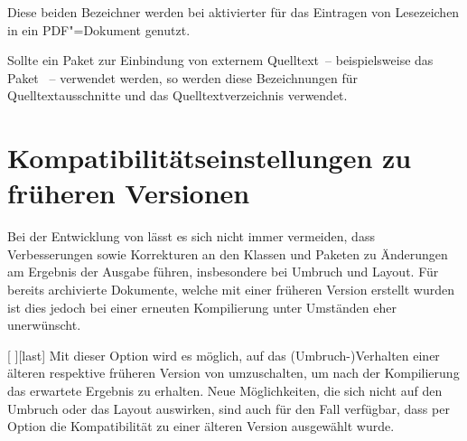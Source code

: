 \begin{Declaration*}{}
\begin{Declaration*}{}
\begin{Declaration*}{}
\begin{Declaration}{}
\begin{Declaration}{}
\printdeclarationlist%
%
%
Diese beiden Bezeichner werden bei aktivierter  für das 
Eintragen von Lesezeichen in ein PDF"=Dokument genutzt.
\end{Declaration}
\end{Declaration}

\begin{Declaration}{}
\begin{Declaration}{}
\printdeclarationlist%
%
Sollte ein Paket zur Einbindung von externem Quelltext~-- beispielsweise 
das Paket ~-- verwendet werden, so werden diese Bezeichnungen 
für Quelltextausschnitte und das Quelltextverzeichnis verwendet.
\end{Declaration}
\end{Declaration}
%

\section{Kompatibilitätseinstellungen zu früheren Versionen}
Bei der Entwicklung von \TUDScript lässt es sich nicht immer vermeiden, dass 
Verbesserungen sowie Korrekturen an den Klassen und Paketen zu Änderungen am 
Ergebnis der Ausgabe führen, insbesondere bei Umbruch und Layout. Für bereits
archivierte Dokumente, welche mit einer früheren Version erstellt wurden ist 
dies jedoch bei einer erneuten Kompilierung unter Umständen eher unerwünscht.

\begin{Declaration}[v2.03]{[%
  \textOR{}\textOR{}%
]}[last]
\printdeclarationlist%
%
%
Mit dieser Option wird es möglich, auf das (Umbruch-)Verhalten einer älteren 
respektive früheren Version von \TUDScript umzuschalten, um nach der 
Kompilierung das erwartete Ergebnis zu erhalten. Neue Möglichkeiten, die sich 
nicht auf den Umbruch oder das Layout auswirken, sind auch für den Fall 
verfügbar, dass per Option die Kompatibilität zu einer älteren Version 
ausgewählt wurde. 


\end{Declaration}
\end{Declaration*}
\end{Declaration*}
\end{Declaration*}
